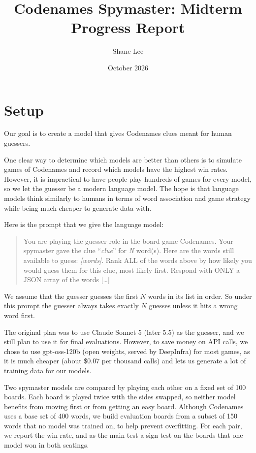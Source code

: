 \documentclass[11pt]{article}
\title{Codenames Spymaster: Midterm Progress Report}
\author{Shane Lee}
\date{October 2026}
\begin{document}
\maketitle

\section{Setup}

Our goal is to create a model that gives Codenames clues meant for human
guessers.

One clear way to determine which models are better than others is to simulate
games of Codenames and record which models have the highest win rates. However,
it is impractical to have people play hundreds of games for every model, so we
let the guesser be a modern language model. The hope is that language models
think similarly to humans in terms of word association and game strategy while
being much cheaper to generate data with.

Here is the prompt that we give the language model:

\begin{quote}\small
You are playing the guesser role in the board game Codenames. Your spymaster gave
the clue ``\emph{clue}'' for \emph{N} word(s). Here are the words still available to
guess: \emph{[words]}. Rank ALL of the words above by how likely you would guess
them for this clue, most likely first. Respond with ONLY a JSON array of the words
[\ldots]
\end{quote}

We assume that the guesser guesses the first $N$ words in its list in order. So
under this prompt the guesser always takes exactly $N$ guesses unless it hits a
wrong word first.

The original plan was to use Claude Sonnet 5 (later 5.5) as the guesser, and we
still plan to use it for final evaluations. However, to save money on API
calls, we chose to use gpt-oss-120b (open weights, served by DeepInfra) for most
games, as it is much cheaper (about \$0.07 per thousand calls) and lets us
generate a lot of training data for our models.

Two spymaster models are compared by playing each other on a fixed set of 100
boards. Each board is played twice with the sides swapped, so neither model
benefits from moving first or from getting an easy board. Although Codenames
uses a base set of 400 words, we build evaluation boards from a subset of 150
words that no model was trained on, to help prevent overfitting. For each pair,
we report the win rate, and as the main test a sign test on the boards that one
model won in both seatings.
\end{document}
